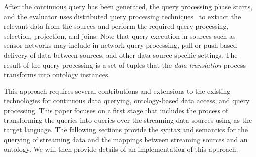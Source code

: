 After the continuous query has been generated, the query processing phase starts, and the evaluator uses distributed query processing techniques~\cite{Kossmann_00} to extract the relevant data from the sources and perform the required query processing, \eg selection, projection, and joins. %
%
Note that query execution in sources such as sensor networks may include in-network query processing, pull or push based delivery of data between sources, and other data source specific settings. The result of the query processing is a set of tuples that the \textit{data translation} process transforms into ontology instances.

This approach requires several contributions and extensions to the existing technologies for continuous data querying, ontology-based data access, and \sparql query processing. 
This paper focuses on a first stage that includes the process of transforming the \sparqlstr queries into queries over the streaming data sources using \sneeql as the target language.
The following sections provide the syntax and semantics for the querying of streaming \rdf data and the mappings between streaming sources and an ontology.
We will then provide details of an implementation of this approach.

